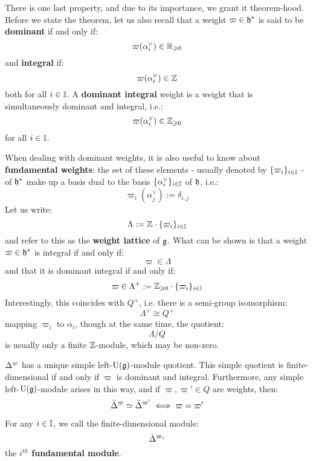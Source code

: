         There is one last property, and due to its importance, we grant it theorem-hood. Before we state the theorem, let us also recall that a weight $\varpi \in \mathfrak{h}^*$ is said to be \textbf{dominant} if and only if:
            $$\varpi(\alpha_i^{\vee}) \in \mathbb{R}_{\geqslant 0}$$
        and \textbf{integral} if:
            $$\varpi(\alpha_i^{\vee}) \in \mathbb{Z}$$
        both for all $i \in \mathbb{I}$. A \textbf{dominant integral} weight is a weight that is simultaneously dominant and integral, i.e.:
            $$\varpi(\alpha_i^{\vee}) \in \mathbb{Z}_{\geqslant 0}$$
        for all $i \in \mathbb{I}$. 
        
        When dealing with dominant weights, it is also useful to know about \textbf{fundamental weights}: the set of these elements - usually denoted by $\{\varpi_i\}_{i \in \mathbb{I}}$ - of $\mathfrak{h}^*$ make up a basis dual to the basis $\{\alpha_i^{\vee}\}_{i \in \mathbb{I}}$ of $\mathfrak{h}$, i.e.:
            $$\varpi_i(\alpha_j^{\vee}) := \delta_{i, j}$$
        Let us write:
            $$\Lambda := \mathbb{Z} \cdot \{\varpi_i\}_{i \in \mathbb{I}}$$
        and refer to this as the \textbf{weight lattice} of $\mathfrak{g}$. What can be shown is that a weight $\varpi \in \mathfrak{h}^*$ is integral if and only if:
            $$\varpi \in \Lambda$$
        and that it is dominant integral if and only if:
            $$\varpi \in \Lambda^+ := \mathbb{Z}_{\geqslant 0} \cdot \{\varpi_i\}_{i \in \mathbb{I}}$$
        Interestingly, this coincides with $Q^+$, i.e. there is a semi-group isomorphism:
            $$\Lambda^+ \cong Q^+$$
        mapping $\varpi_i$ to $\alpha_i$, though at the same time, the quotient:
            $$\Lambda/Q$$
        is usually only a finite $\mathbb{Z}$-module, which may be non-zero.
        \begin{theorem} \label{theorem: classification_of_finite_dimensional_simple_modules_over_finite_dimensional_simple_lie_algebras}
            $\Delta^{\varpi}$ has a unique simple left-$\mathrm{U}(\mathfrak{g})$-module quotient. This simple quotient is finite-dimensional if and only if $\varpi$ is dominant and integral. Furthermore, any simple left-$\mathrm{U}(\mathfrak{g})$-module arises in this way, and if $\varpi, \varpi' \in Q$ are weights, then:
                $$\bar{\Delta}^{\varpi} \simeq \bar{\Delta}^{\varpi'} \iff \varpi = \varpi'$$
        \end{theorem}
        For any $i \in \mathbb{I}$, we call the finite-dimensional module:
            $$\bar{\Delta}^{\varpi_i}$$
        the \textbf{$i^{th}$ fundamental module}.

